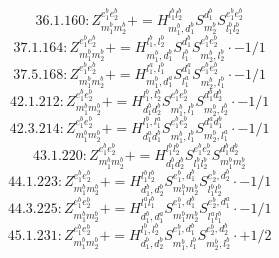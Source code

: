 \documentclass[letterpaper,10pt,fleqn,leqno,onecolumn]{article}
\begin{document}
\begin{equation} \;\;\;\;\;\;  36.1.160: Z^{e_{1}^{b}e_{2}^{b}}_{m_{1}^{b}m_{2}^{b}}+=H^{l_{1}^{b}l_{2}^{b}}_{m_{1}^{b},d_{1}^{b}}S^{d_{1}^{b}}_{m_{2}^{b}}S^{e_{1}^{b}e_{2}^{b}}_{l_{1}^{b}l_{2}^{b}} \end{equation}
\begin{equation} \;\;\;\;\;\;  37.1.164: Z^{e_{1}^{b}e_{2}^{b}}_{m_{1}^{b}m_{2}^{b}}+=H^{l_{1}^{b},l_{2}^{b}}_{m_{1}^{b},d_{1}^{b}}S^{d_{1}^{b}}_{l_{1}^{b}}S^{e_{1}^{b}e_{2}^{b}}_{m_{2}^{b},l_{2}^{b}}\cdot -1/1 \end{equation}
\begin{equation} \;\;\;\;\;\;  37.5.168: Z^{e_{1}^{b}e_{2}^{b}}_{m_{1}^{b}m_{2}^{b}}+=H^{l_{1}^{a},l_{1}^{b}}_{m_{1}^{b},d_{1}^{a}}S^{d_{1}^{a}}_{l_{1}^{a}}S^{e_{1}^{b}e_{2}^{b}}_{m_{2}^{b},l_{1}^{b}}\cdot -1/1 \end{equation}
\begin{equation} \;\;\;\;\;\;  42.1.212: Z^{e_{1}^{b}e_{2}^{b}}_{m_{1}^{b}m_{2}^{b}}+=H^{l_{1}^{b},l_{2}^{b}}_{d_{1}^{b}d_{2}^{b}}S^{e_{1}^{b}e_{2}^{b}}_{m_{1}^{b},l_{1}^{b}}S^{d_{1}^{b}d_{2}^{b}}_{m_{2}^{b},l_{2}^{b}}\cdot -1/1 \end{equation}
\begin{equation} \;\;\;\;\;\;  42.3.214: Z^{e_{1}^{b}e_{2}^{b}}_{m_{1}^{b}m_{2}^{b}}+=H^{l_{1}^{b},l_{1}^{a}}_{d_{1}^{a}d_{1}^{b}}S^{e_{1}^{b}e_{2}^{b}}_{m_{1}^{b},l_{1}^{b}}S^{d_{1}^{a}d_{1}^{b}}_{m_{2}^{b},l_{1}^{a}}\cdot -1/1 \end{equation}
\begin{equation} \;\;\;\;\;\;  43.1.220: Z^{e_{1}^{b}e_{2}^{b}}_{m_{1}^{b}m_{2}^{b}}+=H^{l_{1}^{b}l_{2}^{b}}_{d_{1}^{b}d_{2}^{b}}S^{e_{1}^{b}e_{2}^{b}}_{l_{1}^{b}l_{2}^{b}}S^{d_{1}^{b}d_{2}^{b}}_{m_{1}^{b}m_{2}^{b}} \end{equation}
\begin{equation} \;\;\;\;\;\;  44.1.223: Z^{e_{1}^{b}e_{2}^{b}}_{m_{1}^{b}m_{2}^{b}}+=H^{l_{1}^{b}l_{2}^{b}}_{d_{1}^{b},d_{2}^{b}}S^{e_{1}^{b},d_{1}^{b}}_{m_{1}^{b}m_{2}^{b}}S^{e_{2}^{b},d_{2}^{b}}_{l_{1}^{b}l_{2}^{b}}\cdot -1/1 \end{equation}
\begin{equation} \;\;\;\;\;\;  44.3.225: Z^{e_{1}^{b}e_{2}^{b}}_{m_{1}^{b}m_{2}^{b}}+=H^{l_{1}^{a}l_{1}^{b}}_{d_{1}^{b},d_{1}^{a}}S^{e_{1}^{b},d_{1}^{b}}_{m_{1}^{b}m_{2}^{b}}S^{e_{2}^{b},d_{1}^{a}}_{l_{1}^{a}l_{1}^{b}}\cdot -1/1 \end{equation}
\begin{equation} \;\;\;\;\;\;  45.1.231: Z^{e_{1}^{b}e_{2}^{b}}_{m_{1}^{b}m_{2}^{b}}+=H^{l_{1}^{b},l_{2}^{b}}_{d_{1}^{b},d_{2}^{b}}S^{e_{1}^{b},d_{1}^{b}}_{m_{1}^{b},l_{1}^{b}}S^{e_{2}^{b},d_{2}^{b}}_{m_{2}^{b},l_{2}^{b}}\cdot +1/2 \end{equation}
\end{document}
